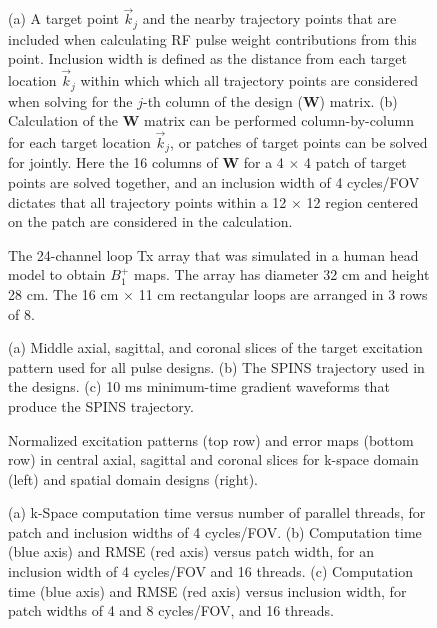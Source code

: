 \documentclass[11pt]{article}
\renewcommand{\textcolor}[1]{}
\begin{document}
\begin{figure}
	\centering
	\caption{(a) A target point $\vec{k}_j$ and the nearby trajectory points that are included when calculating 
	RF pulse weight contributions from this point.
	Inclusion width is defined as the distance from each target location $\vec{k}_j$ within which 
	which all trajectory points are considered when solving for the $j$-th column of the design ($\bm{W}$) matrix.
	(b) Calculation of the $\bm{W}$ matrix can be performed column-by-column for each target location $\vec{k}_j$,
	or patches of target points can be solved for jointly. 
	Here the 16 columns of $\bm{W}$ for a 4 $\times$ 4 patch of target points are solved together,
	and an inclusion width of 4 cycles/FOV dictates that all trajectory points within a 12 $\times$ 12 region
	centered on the patch are considered in the calculation.}
	\label{fig:Patch}
\end{figure}

\begin{figure}
	\centering
	\caption{The 24-channel loop Tx array that was simulated in a human head model to obtain $B_1^+$ maps. 
	The array has diameter 32 cm and height 28 cm. The 16 cm $\times$ 11 cm rectangular loops are arranged in 3 rows of 8.}
	\label{fig:Coil}
\end{figure}

\begin{figure}
	\centering
	\caption{(a) Middle axial, sagittal, and coronal slices of the target excitation pattern used for all pulse designs. 
	(b) The SPINS trajectory used in the designs. 
	(c) 10 ms minimum-time gradient waveforms that produce the SPINS trajectory.}
	\label{fig:Target}
\end{figure}

\begin{figure}
	\centering
	\caption{ %
	Normalized excitation patterns (top row) and error maps (bottom row) in central axial, sagittal and coronal slices 
	for k-space domain (left) and spatial domain designs (right).}
	\label{fig:ErrorMap}
\end{figure}

\begin{figure}
	\centering
	\caption{(a) k-Space computation time versus number of parallel threads, for patch and inclusion widths of 4 cycles/FOV. 
	(b) Computation time (blue axis) and RMSE (red axis) versus patch width, for an inclusion width of 4 cycles/FOV and 16 threads. 
	(c) Computation time (blue axis) and RMSE (red axis) versus inclusion width, for patch widths of 4 and 8 cycles/FOV, and 16 threads.}
	\label{fig:ComputationTime}
\end{figure}
\end{document}
